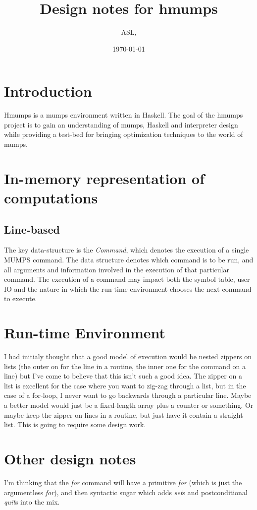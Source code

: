 \documentclass{article}
\title{Design notes for {\sc hmumps}}
\date{\today}
\author{ASL,}
\begin{document}
\maketitle


\section{Introduction}

{\sc Hmumps} is a {\sc mumps} environment written in Haskell.
The goal of the {\sc hmumps} project is to gain an understanding of {\sc mumps}, Haskell and interpreter design while providing a test-bed for bringing optimization techniques to the world of {\sc mumps}.

\section{In-memory representation of computations}

\subsection{Line-based}

The key data-structure is the {\em Command},  which denotes the execution of a single {\sc MUMPS} command.
The data structure denotes which command is to be run, and all arguments and information involved in the execution of that particular command.
The execution of a command may impact both the symbol table, user IO and the nature in which the run-time environment chooses the next command to execute.



\section{Run-time Environment}

I had initialy thought that a good model of execution would be nested zippers on lists (the outer on for the line in a routine, the inner one for the command on a line) but I've come to believe that this isn't such a good idea.
The zipper on a list is excellent for the case where you want to zig-zag through a list, but in the case of a for-loop, I never want to go backwards through a particular line.
Maybe a better model would just be a fixed-length array plus a counter or something.
Or maybe keep the zipper on lines in a routine, but just have it contain a straight list.
This is going to require some design work.

\section{Other design notes}

I'm thinking that the {\em for} command will have a primitive {\em for} (which is just the argumentless {\em for}), and then syntactic sugar which adds {\em set}s and postconditional {\em quit}s into the mix.
\end{document}
